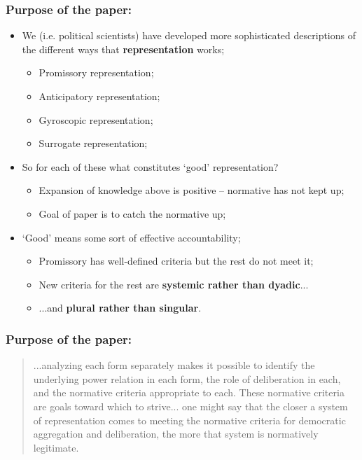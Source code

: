 \documentclass[aspectratio=169]{beamer}
\theoremstyle{principle}
\begin{document}
\begin{frame}
\frametitle{Purpose of the paper:}
\begin{itemize}
\item We (i.e. political scientists) have developed more sophisticated descriptions of the different ways that \textbf{representation} works;
\begin{itemize}
\item Promissory representation;
\item Anticipatory representation;
\item Gyroscopic representation;
\item Surrogate representation;
\end{itemize}
\bigskip
\bigskip
\item So for each of these what constitutes `good' representation?
\begin{itemize}
\item Expansion of knowledge above is positive -- normative has not kept up;
\item Goal of paper is to catch the normative up;
\end{itemize}
\bigskip
\bigskip
\item `Good' means some sort of effective accountability;
\begin{itemize}
\item Promissory has well-defined criteria but the rest do not meet it;
\item New criteria for the rest are \textbf{systemic rather than dyadic}...
\item ...and \textbf{plural rather than singular}.
\end{itemize}
\end{itemize}
\end{frame}

\begin{frame}
\frametitle{Purpose of the paper:}
\begin{quote}
...analyzing each form separately makes it possible to identify the underlying power relation in each form, the role of deliberation in each, and the normative criteria appropriate to each. These normative criteria are goals toward which to strive... one might say that the closer a system of representation comes to meeting the normative criteria for democratic aggregation and deliberation, the more that system is normatively legitimate.
\end{quote}
\end{frame}
\end{document}
